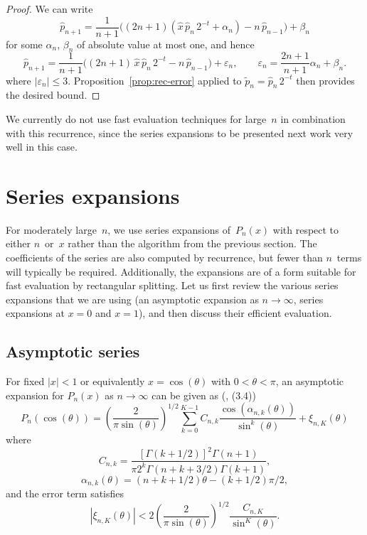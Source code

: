 \documentclass[11pt,a4paper]{article}
\newcommand{\abs}[1]{\mathopen| #1 \mathclose|}
\begin{document}
\begin{proof}
We can write
\[
  \hat{p}_{n + 1} = \frac{1}{n + 1}  \bigl((2 n + 1)  (\hat{x} \,
        \hat{p}_n \, 2^{- t} + \alpha_n) - n \, \hat{p}_{n - 1}\bigr)
        + \beta_n
\]
for some $\alpha_n$, $\beta_n$ of absolute value at most one, and
hence
\[
  \hat{p}_{n + 1} = \frac{1}{n + 1}  \bigl((2 n + 1) \, \hat{x} \,
  \hat{p}_n \, 2^{- t} - n \, \hat{p}_{n - 1}\bigr) + \varepsilon_n,
  \qquad
  \varepsilon_n = \frac{2 n + 1}{n + 1} \alpha_n + \beta_n.
\]
where $\abs{\varepsilon_n} \leq 3$.
Proposition \ref{prop:rec-error} applied to
$\tilde p_n = \hat p_n \, 2^{-t}$
then provides the desired bound.
\end{proof}

We currently do not use fast evaluation techniques for large~$n$ in
combination with this recurrence, since the series expansions to be
presented next work very well in this case.

\section{Series expansions}

\label{sec:series}

For moderately large $n$, we use series expansions of $P_n(x)$ with
respect to either $n$ or $x$ rather than the algorithm from the
previous section.
The coefficients of the series are also computed by recurrence,
but fewer than $n$ terms will typically be required.
Additionally, the expansions are of a form suitable for fast
evaluation by rectangular splitting.
Let us first review the various series expansions that we are using
(an asymptotic expansion as $n \to \infty$, series expansions at $x=0$
and $x=1$), and then discuss their efficient evaluation.

\subsection{Asymptotic series}

For fixed $|x| < 1$ or equivalently $x = \cos(\theta)$ with $0 < \theta < \pi$,
an asymptotic expansion for $P_n(x)$ as $n \to \infty$
can be given as (\cite{Bogaert2012}, (3.4))
\begin{equation}
\label{eq:asymptotic}
P_n(\cos(\theta)) = \left(\frac{2}{\pi \sin(\theta)}\right)^{1/2}
\sum_{k=0}^{K-1} C_{n,k} \frac{\cos(\alpha_{n,k}(\theta))}{\sin^k(\theta)}
+ \xi_{n,K}(\theta)
\end{equation}
where
\begin{equation}
C_{n,k} = \frac{[\Gamma(k+1/2)]^2 \Gamma(n+1)}{\pi 2^k \Gamma(n+k+3/2) \Gamma(k+1)},
\end{equation}
\begin{equation}
\alpha_{n,k}(\theta) = (n+k+1/2) \theta - (k+1/2) \pi / 2,
\end{equation}
and the error term satisfies
\begin{equation}
|\xi_{n,K}(\theta)| < 2 \left(\frac{2}{\pi \sin(\theta)}\right)^{1/2} \frac{C_{n,K}}{\sin^K(\theta)}.
\end{equation}
\end{document}
